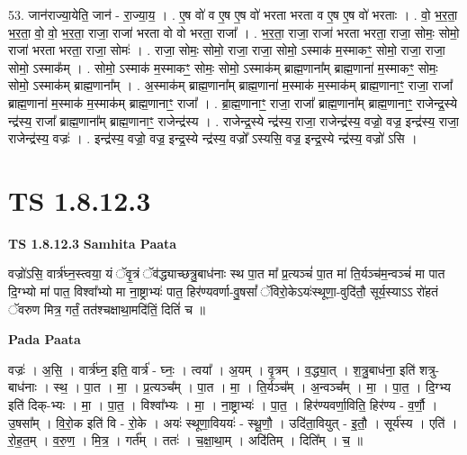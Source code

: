 \documentclass[17pt]{extarticle}
\begin{document}
53. जान॑राज्या॒येति॒ जान॑ - रा॒ज्या॒य॒ । . ए॒ष वो॑ व ए॒ष ए॒ष वो॑ भरता भरता व ए॒ष ए॒ष वो॑ भरताः । . वो॒ भ॒र॒ता॒ भ॒र॒ता॒ वो॒ वो॒ भ॒र॒ता॒ राजा॒ राजा॑ भरता वो वो भरता॒ राजा᳚ । . भ॒र॒ता॒ राजा॒ राजा॑ भरता भरता॒ राजा॒ सोमः॒ सोमो॒ राजा॑ भरता भरता॒ राजा॒ सोमः॑ । . राजा॒ सोमः॒ सोमो॒ राजा॒ राजा॒ सोमो॒ ऽस्माक॑ म॒स्माकꣳ॒॒ सोमो॒ राजा॒ राजा॒ सोमो॒ ऽस्माक᳚म् । . सोमो॒ ऽस्माक॑ म॒स्माकꣳ॒॒ सोमः॒ सोमो॒ ऽस्माक॑म् ब्राह्म॒णाना᳚म् ब्राह्म॒णाना॑ म॒स्माकꣳ॒॒ सोमः॒ सोमो॒ ऽस्माक॑म् ब्राह्म॒णाना᳚म् । . अ॒स्माक॑म् ब्राह्म॒णाना᳚म् ब्राह्म॒णाना॑ म॒स्माक॑ म॒स्माक॑म् ब्राह्म॒णानाꣳ॒॒ राजा॒ राजा᳚ ब्राह्म॒णाना॑ म॒स्माक॑ म॒स्माक॑म् ब्राह्म॒णानाꣳ॒॒ राजा᳚ । . ब्रा॒ह्म॒णानाꣳ॒॒ राजा॒ राजा᳚ ब्राह्म॒णाना᳚म् ब्राह्म॒णानाꣳ॒॒ राजेन्द्र॒स्ये न्द्र॑स्य॒ राजा᳚ ब्राह्म॒णाना᳚म् ब्राह्म॒णानाꣳ॒॒ राजेन्द्र॑स्य । . राजेन्द्र॒स्ये न्द्र॑स्य॒ राजा॒ राजेन्द्र॑स्य॒ वज्रो॒ वज्र॒ इन्द्र॑स्य॒ राजा॒ राजेन्द्र॑स्य॒ वज्रः॑ । . इन्द्र॑स्य॒ वज्रो॒ वज्र॒ इन्द्र॒स्ये न्द्र॑स्य॒ वज्रो᳚ ऽस्यसि॒ वज्र॒ इन्द्र॒स्ये न्द्र॑स्य॒ वज्रो॑ ऽसि । \newline
\pagebreak
{}
\section*{ TS 1.8.12.3 }

\textbf{TS 1.8.12.3 } \newline
\textbf{Samhita Paata} \newline

वज्रो॑ऽसि॒ वार्त्र॑घ्न॒स्त्वया॒ यं ॅवृ॒त्रं ॅव॑द्ध्याच्छत्रु॒बाध॑नाः स्थ पा॒त मा᳚ प्र॒त्यञ्चं॑ पा॒त मा॑ ति॒र्यञ्च॑म॒न्वञ्चं॑ मा पात दि॒ग्भ्यो मा॑ पात॒ विश्वा᳚भ्यो मा ना॒ष्ट्राभ्यः॑ पात॒ हिर॑ण्यवर्णा-वु॒षसां᳚ ॅविरो॒केऽयः॑स्थूणा॒-वुदि॑तौ॒ सूर्य॒स्याऽऽ रो॑हतं ॅवरुण मित्र॒ गर्तं॒ तत॑श्चक्षाथा॒मदि॑तिं॒ दितिं॑ च ॥ \newline

\textbf{Pada Paata} \newline

वज्रः॑ । अ॒सि॒ । वार्त्र॑घ्न॒ इति॒ वार्त्र॑ - घ्नः॒ । त्वया᳚ । अ॒यम् । वृ॒त्रम् । व॒द्ध्या॒त् । श॒त्रु॒बाध॑ना॒ इति॑ शत्रु-बाध॑नाः । स्थ॒ । पा॒त । मा॒ । प्र॒त्यञ्च᳚म् । पा॒त । मा॒ । ति॒र्यञ्च᳚म् । अ॒न्वञ्च᳚म् । मा॒ । पा॒त॒ । दि॒ग्भ्य इति॑ दिक्-भ्यः । मा॒ । पा॒त॒ । विश्वा᳚भ्यः । मा॒ । ना॒ष्ट्राभ्यः॑ । पा॒त॒ । हिर॑ण्यवर्णा॒विति॒ हिर॑ण्य - व॒र्णौ॒ । उ॒षसा᳚म् । वि॒रो॒क इति॑ वि - रो॒के । अयः॑ स्थूणा॒विययः॑ - स्थू॒णौ॒ । उदि॑ता॒वियुत् - इ॒तौ॒ । सूर्य॑स्य । एति॑ । रो॒ह॒त॒म् । व॒रु॒ण॒ । मि॒त्र॒ । गर्त᳚म् । ततः॑ । च॒क्षा॒था॒म् । अदि॑तिम् । दिति᳚म् । च॒ ॥  \newline
\end{document}
